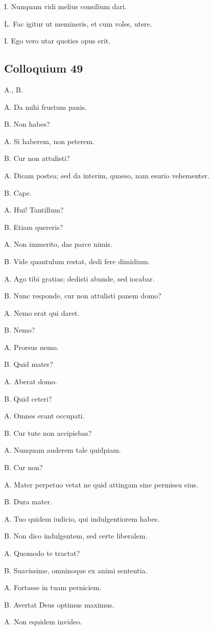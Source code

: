 \documentclass{article}
\begin{document}
I. Nunquam vidi melius consilium dari.

L. Fac igitur ut memineris, et cum voles, utere.

I. Ego vero utar quoties opus erit.

\subsection{Colloquium 49}
A., B.

A. Da mihi frustum panis.

B. Non habes?

A. Si haberem, non peterem.

B. Cur non attulisti?

A. Dicam postea; sed da interim, quaeso, nam esurio vehementer.

B. Cape.

A. Hui! Tantillum?

B. Etiam quereris?

A. Non immerito, das parce nimis.

B. Vide quantulum restat, dedi fere dimidium.

A. Ago tibi gratias; dedisti abunde, sed iocabar.

B. Nunc responde, cur non attulisti panem domo?

A. Nemo erat qui daret.

B. Nemo?

A. Prorsus nemo.

B. Quid mater?

A. Aberat domo.

B. Quid ceteri?

A. Omnes erant occupati.

B. Cur tute non accipiebas?

A. Nunquam auderem tale quidpiam.

B. Cur non?

A. Mater perpetuo vetat ne quid attingam sine permissu eius.

B. Dura mater.

A. Tuo quidem iudicio, qui indulgentiorem habes.

B. Non dico indulgentem, sed certe liberalem.

A. Quomodo te tractat?

B. Suavissime, omninoque ex animi sententia.

A. Fortasse in tuam perniciem.

B. Avertat Deus optimus maximus.

A. Non equidem invideo.
\end{document}

